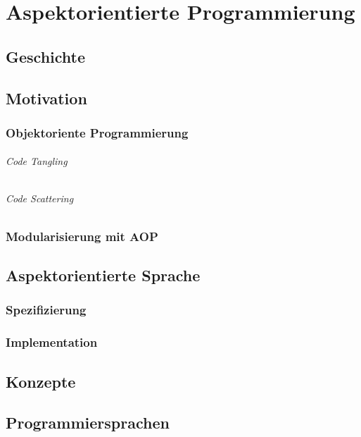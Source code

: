 \chapter{Aspektorientierte Programmierung}
\label{chap:aop}

\section{Geschichte}
\label{sec:aop_geschichte}

\section{Motivation}
\label{sec:aop_motivation}

\subsection{Objektoriente Programmierung}
\label{sec:aop_oop}

\subparagraph{Code Tangling}

\subparagraph{Code Scattering}

\subsection{Modularisierung mit AOP}
\label{sec:aop_modaop}


\section{Aspektorientierte Sprache}
\label{sec:aop_lang}

\subsection{Spezifizierung}

\subsection{Implementation}

\section{Konzepte}

\section{Programmiersprachen}